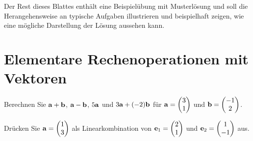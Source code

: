 \documentclass[11pt]{scrartcl}
\begin{document}
\sepline[.75\textwidth]

Der Rest dieses Blattes enthält eine Beispielübung mit Musterlösung und soll die Herangehensweise an typische Aufgaben illustrieren und beispielhaft zeigen, wie eine mögliche Darstellung der Lösung aussehen kann.

\section{Elementare Rechenoperationen mit Vektoren}
\begin{subex}
  \item Berechnen Sie $\mathbf{a} + \mathbf{b}$, $\mathbf{a} - \mathbf{b}$, $5 \mathbf{a}$ und $3 \mathbf{a} + (-2) \mathbf{b}$ für $\mathbf{a} = \begin{pmatrix}3 \\ 1\end{pmatrix}$ und $\mathbf{b} = \begin{pmatrix} -1 \\ 2 \end{pmatrix}$.
  \item Drücken Sie $\mathbf{a} = \begin{pmatrix} 1 \\ 3 \end{pmatrix}$ als Linearkombination von $\mathbf{e}_1 = \begin{pmatrix} 2 \\ 1 \end{pmatrix}$ und $\mathbf{e}_2 = \begin{pmatrix} 1 \\ -1 \end{pmatrix}$ aus.
\end{subex}
\end{document}
